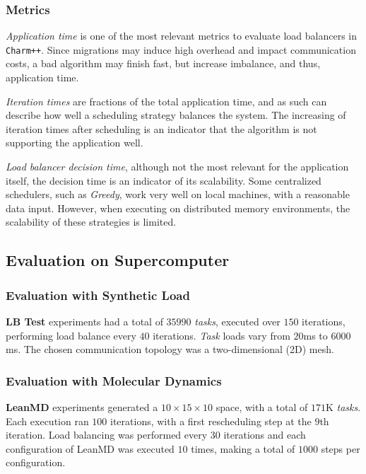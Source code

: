 \subsubsection*{Metrics}

\textit{Application time} is one of the most relevant metrics to evaluate load balancers in \texttt{Charm++}.
Since migrations may induce high overhead and impact communication costs, a bad algorithm may finish fast, but increase imbalance, and thus, application time.

\textit{Iteration times} are fractions of the total application time, and as such can describe how well a scheduling strategy balances the system.
The increasing of iteration times after scheduling is an indicator that the algorithm is not supporting the application well.

\textit{Load balancer decision time}, although not the most relevant for the application itself, the decision time is an indicator of its scalability.
Some centralized schedulers, such as \textit{Greedy}, work very well on local machines, with a reasonable data input.
However, when executing on distributed memory environments, the scalability of these strategies is limited.

\subsection{Evaluation on Supercomputer}

\subsubsection*{Evaluation with Synthetic Load}

\textbf{LB Test} experiments had a total of $35990$ \textit{tasks}, executed over $150$ iterations, performing load balance every $40$ iterations.
\textit{Task} loads vary from $20$ms to $6000$ms. The chosen communication topology was a two-dimensional (2D) mesh.

\subsubsection*{Evaluation with Molecular Dynamics}

\textbf{LeanMD} experiments generated a $10\times15\times10$ space, with a total of $171$K \textit{tasks}.
Each execution ran $100$ iterations, with a first rescheduling step at the $9$th iteration. 
Load balancing was performed every $30$ iterations and each configuration of LeanMD was executed $10$ times, making a total of $1000$ steps per configuration. 


